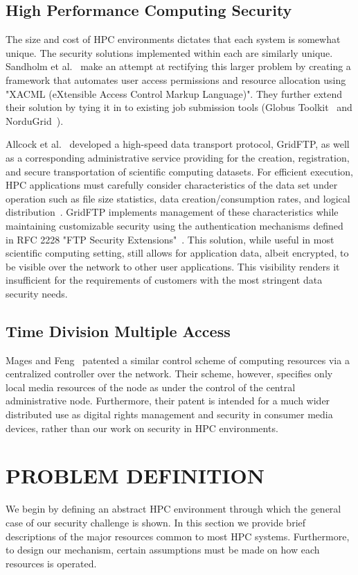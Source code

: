 \documentclass[oneside,12pt]{memoir}
\begin{document}
\section{High Performance Computing Security}
The size and cost of HPC environments dictates that each system is somewhat unique. The security solutions implemented within each are similarly unique. Sandholm et al.~\cite{sandholm2004ogsa} make an attempt at rectifying this larger problem by creating a framework that automates user access permissions and resource allocation using "XACML (eXtensible Access Control Markup Language)". They further extend their solution by tying it in to existing job submission tools (Globus Toolkit~\cite{globus_toolkit} and NorduGrid~\cite{nordugrid}). 

Allcock et al.~\cite{allcock2001secure} developed a high-speed data transport protocol, GridFTP, as well as a corresponding administrative service providing for the creation, registration, and secure transportation of scientific computing datasets. For efficient execution, HPC applications must carefully consider characteristics of the data set under operation such as file size statistics, data creation/consumption rates, and logical distribution~\cite{chervenak2000data}. GridFTP implements management of these characteristics while maintaining customizable security using the authentication mechanisms defined in RFC 2228 "FTP Security Extensions"~\cite{horowitz1997ftp}. This solution, while useful in most scientific computing setting, still allows for application data, albeit encrypted, to be visible over the network to other user applications. This visibility renders it insufficient for the requirements of customers with the most stringent data security needs.
\section{Time Division Multiple Access}
Mages and Feng~\cite{mages1999method} patented a similar control scheme of computing resources via a centralized controller over the network. Their scheme, however, specifies only local media resources of the node as under the control of the central administrative node. Furthermore, their patent is intended for a much wider distributed use as digital rights management and security in consumer media devices, rather than our work on security in HPC environments.

\chapter{PROBLEM DEFINITION}
\label{chap:problem_definition}
We begin by defining an abstract HPC environment through which the general case of our security challenge is shown. In this section we provide brief descriptions of the major resources common to most HPC systems. Furthermore, to design our mechanism, certain assumptions must be made on how each resources is operated. 
\end{document}
